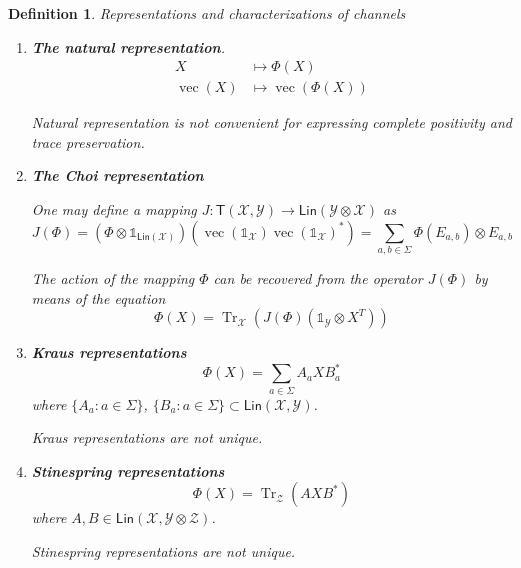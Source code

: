 \documentclass[aps,pra,onecolumn,notitlepage,superscriptaddress]{revtex4-1}
\newcommand{\spc}[1]{\mathcal{#1}}
\newcommand{\Lin}{\mathsf{Lin}}
\newcommand{\T}{\mathsf{T}}
\newcommand{\Tr}{\operatorname{Tr}}
\newcommand{\op}[1]{\operatorname{#1}}
\newcommand\I{\mathds{1}}
\newtheorem{defi}{Definition}
\begin{document}
    \begin{defi}
        Representations and characterizations of channels
        \begin{enumerate}
            \item \textbf{The natural representation}.
            \begin{align}
                X &\mapsto \Phi(X) \\
                \op{vec}(X) &\mapsto \op{vec}(\Phi(X))
            \end{align}

            Natural representation is not convenient for expressing complete positivity and trace preservation.

            \item \textbf{The Choi representation}
            
            One may define a mapping $J : \T(\spc X, \spc Y) \to \Lin(\spc Y \otimes \spc X)$ as
            \begin{equation}
                J(\Phi) = (\Phi \otimes \I_{\Lin(\spc X)}) (\op{vec}(\I_{\spc X}) \op{vec}(\I_{\spc X})^*) = \sum_{a,b \in \Sigma} \Phi(E_{a,b}) \otimes E_{a,b}
            \end{equation}

            The action of the mapping $\Phi$ can be recovered from the operator $J(\Phi)$ by means of the equation
            \begin{equation}
                \Phi(X) = \Tr_{\spc X} ( J(\Phi) (\I_{\spc Y} \otimes X^T) )
            \end{equation}
            \item \textbf{Kraus representations}
            \begin{equation}
                \Phi(X) = \sum_{a \in \Sigma} A_a X B_a^*
            \end{equation}
            where $\{ A_a : a \in \Sigma \}$, $\{ B_a : a \in \Sigma \} \subset \Lin(\spc X, \spc Y)$.

            Kraus representations are not unique.

            \item \textbf{Stinespring representations}
            \begin{equation}
                \Phi(X) = \Tr_{\spc Z}(AXB^*)
            \end{equation}
            where $A,B \in \Lin(\spc X, \spc Y \otimes \spc Z)$.

            Stinespring representations are not unique.
        \end{enumerate}
    \end{defi}
\end{document}
